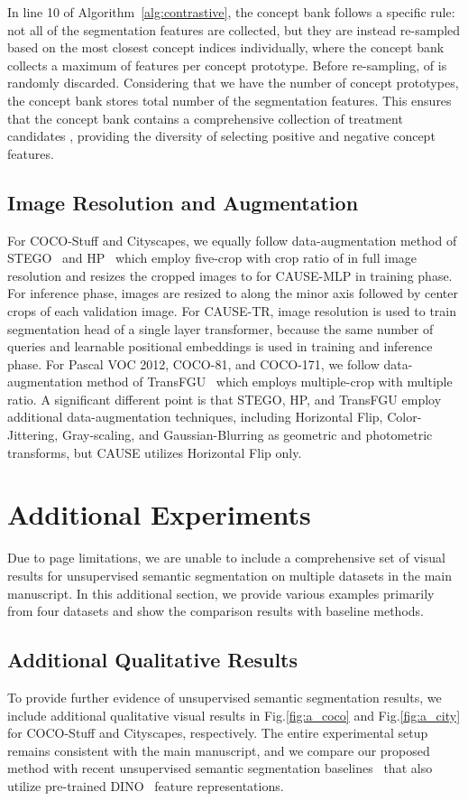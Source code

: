 \documentclass{article} \usepackage{iclr2024_conference,times}
\begin{document}
In line 10 of Algorithm~\ref{alg:contrastive}, the concept bank  follows a specific rule: not all of the segmentation features  are collected, but they are instead  re-sampled based on the most closest concept indices individually, where the concept bank collects a maximum of  features per concept prototype. Before re-sampling,  of  is randomly discarded. Considering that we have the number  of concept prototypes, the concept bank stores total number  of the segmentation features. This ensures that the concept bank contains a comprehensive collection of treatment candidates , providing the diversity of selecting positive and negative concept features.

\subsection{Image Resolution and Augmentation}
For COCO-Stuff and Cityscapes, we equally follow data-augmentation method of STEGO~\citep{hamilton2022unsupervised} and HP~\citep{seong2023leveraging} which employ five-crop with crop ratio of  in full image resolution and resizes the cropped images to  for CAUSE-MLP in training phase. For inference phase, images are resized to  along the minor axis followed by center crops of each validation image. For CAUSE-TR,  image resolution is used to train segmentation head of a single layer transformer, because the same number of queries and learnable positional embeddings is used in training and inference phase. For Pascal VOC 2012, COCO-81, and COCO-171, we follow data-augmentation method of TransFGU~\citep{yin2022transfgu} which employs multiple-crop with multiple ratio. A significant different point is that STEGO, HP, and TransFGU employ additional data-augmentation techniques, including Horizontal Flip, Color-Jittering, Gray-scaling, and Gaussian-Blurring as geometric and photometric transforms, but CAUSE utilizes Horizontal Flip only.

\section{Additional Experiments}
\label{appendix:C}
Due to page limitations, we are unable to include a comprehensive set of visual results for unsupervised semantic segmentation on multiple datasets in the main manuscript. In this additional section, we provide various examples primarily from four datasets and show the comparison results with baseline methods.


\subsection{Additional Qualitative Results}
To provide further evidence of unsupervised semantic segmentation results, we include additional qualitative visual results in Fig.\ref{fig:a_coco} and Fig.\ref{fig:a_city} for COCO-Stuff and Cityscapes, respectively. The entire experimental setup remains consistent with the main manuscript, and we compare our proposed method with recent unsupervised semantic segmentation baselines~\citep{hamilton2022unsupervised, seong2023leveraging, shin2022reco} that also utilize pre-trained DINO~\citep{caron2021emerging} feature representations.
\end{document}
